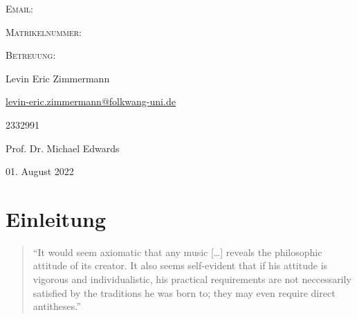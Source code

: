 \documentclass[12pt,a4paper,ngerman]{article}
\newcommand{\mailto}[1]{\href{mailto:#1}{#1}}
\begin{document}
\begin{titlepage}
\begin{minipage}[b]{.25\textwidth}
\begin{flushleft}
\textsc{Email:}

\textsc{Matrikelnummer:}

\textsc{Betreuung:}
\end{flushleft}
\end{minipage}%
\begin{minipage}[b]{.5\textwidth}
\begin{flushleft}
Levin Eric Zimmermann %

{\normalsize \mailto{levin-eric.zimmermann@folkwang-uni.de}}

2332991

Prof. Dr. Michael Edwards
\end{flushleft}
\end{minipage}

\vspace{2cm}



{\large 01. August 2022}\\[2cm] %

\vfill %

\end{titlepage}

\newpage


\tableofcontents


\newpage


\section{Einleitung}

\begin{quote}
    ``It would seem axiomatic that any music [\dots] reveals the philosophic attitude of its creator.
    It also seems self-evident that if his attitude is vigorous and individualistic, his practical requirements are not neccessarily satisfied by the traditions he was born to;
    they may even require direct antitheses.''~\cite{genesisOfMusic}
\end{quote}
\end{document}

